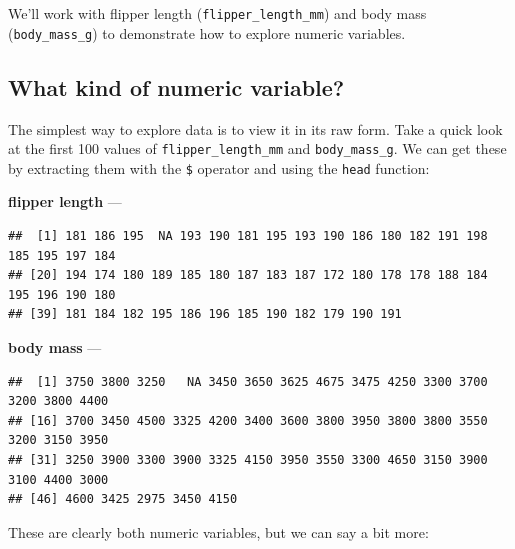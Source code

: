 \documentclass[
]{book}
\newenvironment{Shaded}{\begin{snugshade}}{\end{snugshade}}
\newcommand{\DecValTok}[1]{\textcolor[rgb]{0.00,0.00,0.81}{#1}}
\newcommand{\FunctionTok}[1]{\textcolor[rgb]{0.00,0.00,0.00}{#1}}
\newcommand{\NormalTok}[1]{#1}
\newcommand{\SpecialCharTok}[1]{\textcolor[rgb]{0.00,0.00,0.00}{#1}}
\begin{document}
We'll work with flipper length (\texttt{flipper\_length\_mm}) and body mass (\texttt{body\_mass\_g}) to demonstrate how to explore numeric variables.

\hypertarget{what-kind-of-numeric-variable}{%
\subsection{What kind of numeric variable?}\label{what-kind-of-numeric-variable}}

The simplest way to explore data is to view it in its raw form. Take a quick look at the first 100 values of \texttt{flipper\_length\_mm} and \texttt{body\_mass\_g}. We can get these by extracting them with the \texttt{\$} operator and using the \texttt{head} function:

\textbf{flipper length} ---

\begin{Shaded}
\end{Shaded}

\begin{verbatim}
##  [1] 181 186 195  NA 193 190 181 195 193 190 186 180 182 191 198 185 195 197 184
## [20] 194 174 180 189 185 180 187 183 187 172 180 178 178 188 184 195 196 190 180
## [39] 181 184 182 195 186 196 185 190 182 179 190 191
\end{verbatim}

\textbf{body mass} ---

\begin{Shaded}
\end{Shaded}

\begin{verbatim}
##  [1] 3750 3800 3250   NA 3450 3650 3625 4675 3475 4250 3300 3700 3200 3800 4400
## [16] 3700 3450 4500 3325 4200 3400 3600 3800 3950 3800 3800 3550 3200 3150 3950
## [31] 3250 3900 3300 3900 3325 4150 3950 3550 3300 4650 3150 3900 3100 4400 3000
## [46] 4600 3425 2975 3450 4150
\end{verbatim}

These are clearly both numeric variables, but we can say a bit more:
\end{document}
